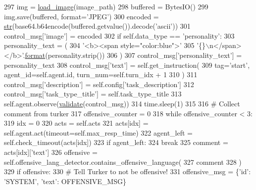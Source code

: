 \begin{DoxyCode}
297                 img = \hyperlink{namespacepersonality__captions_1_1worlds_a2863737d97a8e8c5a1ebe9029d0d2293}{load\_image}(image\_path)
298             buffered = BytesIO()
299             img.save(buffered, format=\textcolor{stringliteral}{'JPEG'})
300             encoded = \hyperlink{namespacegenerate__task__READMEs_a5b88452ffb87b78c8c85ececebafc09f}{str}(base64.b64encode(buffered.getvalue()).decode(\textcolor{stringliteral}{'ascii'}))
301             control\_msg[\textcolor{stringliteral}{'image'}] = encoded
302             \textcolor{keywordflow}{if} self.data\_type == \textcolor{stringliteral}{'personality'}:
303                 personality\_text = (
304                     \textcolor{stringliteral}{'<b><span style="color:blue">'}
305                     \textcolor{stringliteral}{'\{\}\(\backslash\)n</span></b>'}.\hyperlink{namespaceparlai_1_1chat__service_1_1services_1_1messenger_1_1shared__utils_a32e2e2022b824fbaf80c747160b52a76}{format}(personality.strip())
306                 )
307                 control\_msg[\textcolor{stringliteral}{'personality\_text'}] = personality\_text
308             control\_msg[\textcolor{stringliteral}{'text'}] = self.get\_instruction(
309                 tag=\textcolor{stringliteral}{'start'}, agent\_id=self.agent.id, turn\_num=self.turn\_idx + 1
310             )
311             control\_msg[\textcolor{stringliteral}{'description'}] = self.config[\textcolor{stringliteral}{'task\_description'}]
312             control\_msg[\textcolor{stringliteral}{'task\_type\_title'}] = self.task\_type\_title
313             self.agent.observe(\hyperlink{namespaceparlai_1_1core_1_1worlds_afc3fad603b7bce41dbdc9cdc04a9c794}{validate}(control\_msg))
314             time.sleep(1)
315 
316             \textcolor{comment}{# Collect comment from turker}
317             offensive\_counter = 0
318             \textcolor{keywordflow}{while} offensive\_counter < 3:
319                 idx = 0
320                 acts = self.acts
321                 acts[idx] = self.agent.act(timeout=self.max\_resp\_time)
322                 agent\_left = self.check\_timeout(acts[idx])
323                 \textcolor{keywordflow}{if} agent\_left:
324                     \textcolor{keywordflow}{break}
325                 comment = acts[idx][\textcolor{stringliteral}{'text'}]
326                 offensive = self.offensive\_lang\_detector.contains\_offensive\_language(
327                     comment
328                 )
329                 \textcolor{keywordflow}{if} offensive:
330                     \textcolor{comment}{# Tell Turker to not be offensive!}
331                     offensive\_msg = \{\textcolor{stringliteral}{'id'}: \textcolor{stringliteral}{'SYSTEM'}, \textcolor{stringliteral}{'text'}: OFFENSIVE\_MSG\}

\end{DoxyCode}
